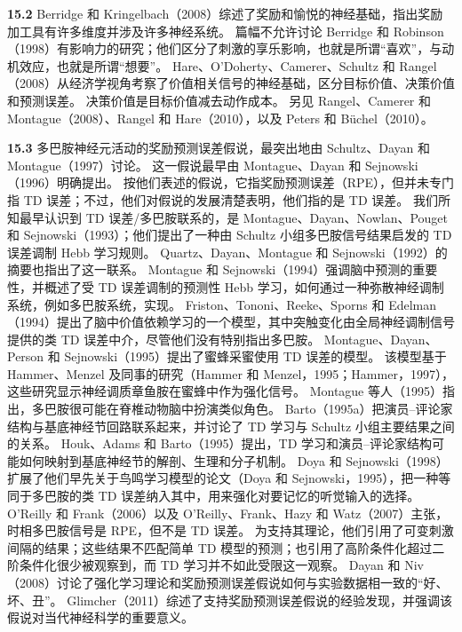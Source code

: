 \documentclass[UTF8, 12pt, fontset=fandol, oneside]{ctexart}
\begin{document}
\noindent\textbf{15.2}
Berridge 和 Kringelbach（2008）综述了奖励和愉悦的神经基础，指出奖励加工具有许多维度并涉及许多神经系统。
篇幅不允许讨论 Berridge 和 Robinson（1998）有影响力的研究；他们区分了刺激的享乐影响，也就是所谓“喜欢”，与动机效应，也就是所谓“想要”。
Hare、O'Doherty、Camerer、Schultz 和 Rangel（2008）从经济学视角考察了价值相关信号的神经基础，区分目标价值、决策价值和预测误差。
决策价值是目标价值减去动作成本。
另见 Rangel、Camerer 和 Montague（2008）、Rangel 和 Hare（2010），以及 Peters 和 Büchel（2010）。

\noindent\textbf{15.3}
多巴胺神经元活动的奖励预测误差假说，最突出地由 Schultz、Dayan 和 Montague（1997）讨论。
这一假说最早由 Montague、Dayan 和 Sejnowski（1996）明确提出。
按他们表述的假说，它指奖励预测误差（RPE），但并未专门指 TD 误差；不过，他们对假说的发展清楚表明，他们指的是 TD 误差。
我们所知最早认识到 TD 误差/多巴胺联系的，是 Montague、Dayan、Nowlan、Pouget 和 Sejnowski（1993）；他们提出了一种由 Schultz 小组多巴胺信号结果启发的 TD 误差调制 Hebb 学习规则。
Quartz、Dayan、Montague 和 Sejnowski（1992）的摘要也指出了这一联系。
Montague 和 Sejnowski（1994）强调脑中预测的重要性，并概述了受 TD 误差调制的预测性 Hebb 学习，如何通过一种弥散神经调制系统，例如多巴胺系统，实现。
Friston、Tononi、Reeke、Sporns 和 Edelman（1994）提出了脑中价值依赖学习的一个模型，其中突触变化由全局神经调制信号提供的类 TD 误差中介，尽管他们没有特别指出多巴胺。
Montague、Dayan、Person 和 Sejnowski（1995）提出了蜜蜂采蜜使用 TD 误差的模型。
该模型基于 Hammer、Menzel 及同事的研究（Hammer 和 Menzel，1995；Hammer，1997），这些研究显示神经调质章鱼胺在蜜蜂中作为强化信号。
Montague 等人（1995）指出，多巴胺很可能在脊椎动物脑中扮演类似角色。
Barto（1995a）把演员--评论家结构与基底神经节回路联系起来，并讨论了 TD 学习与 Schultz 小组主要结果之间的关系。
Houk、Adams 和 Barto（1995）提出，TD 学习和演员--评论家结构可能如何映射到基底神经节的解剖、生理和分子机制。
Doya 和 Sejnowski（1998）扩展了他们早先关于鸟鸣学习模型的论文（Doya 和 Sejnowski，1995），把一种等同于多巴胺的类 TD 误差纳入其中，用来强化对要记忆的听觉输入的选择。
O'Reilly 和 Frank（2006）以及 O'Reilly、Frank、Hazy 和 Watz（2007）主张，时相多巴胺信号是 RPE，但不是 TD 误差。
为支持其理论，他们引用了可变刺激间隔的结果；这些结果不匹配简单 TD 模型的预测；也引用了高阶条件化超过二阶条件化很少被观察到，而 TD 学习并不如此受限这一观察。
Dayan 和 Niv（2008）讨论了强化学习理论和奖励预测误差假说如何与实验数据相一致的“好、坏、丑”。
Glimcher（2011）综述了支持奖励预测误差假说的经验发现，并强调该假说对当代神经科学的重要意义。
\end{document}
